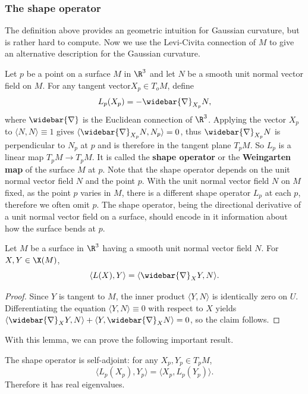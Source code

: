 \subsubsection{The shape operator}
The definition above provides an geometric intuition for Gaussian curvature, but is rather hard to compute. Now we use the Levi-Civita connection of $M$ to give an 
alternative description for the Gaussian curvature.\par
Let $p$ be a point on a surface $M$ in $\R^3$ and let $N$ be a smooth unit normal vector field on $M$. For any tangent vector$X_p\in T_oM$, define
\[L_p(X_p)=-\widebar{\nabla}_{X_p}N,\]
where $\widebar{\nabla}$ is the Euclidean connection of $\R^3$. Applying the vector $X_p$ to $\langle N,N\rangle\equiv 1$ gives $\langle\widebar{\nabla}_{X_p}N,N_p\rangle=0$, 
thus $\widebar{\nabla}_{X_p}N$ is perpendicular to $N_p$ at $p$ and is therefore in the tangent plane $T_pM$. So $L_p$ is a linear map $T_pM\to T_pM$. It is called the 
\textbf{shape operator} or the \textbf{Weingarten map} of the surface $M$ at $p$. Note that the shape operator depends on the unit normal vector field $N$ and the point 
$p$. With the unit normal vector field $N$ on $M$ fixed, as the point $p$ varies in $M$, there is a different shape operator $L_p$ at each $p$, therefore we often omit $p$.
The shape operator, being the directional derivative of a unit normal vector field on a surface, should encode in it information about how the surface bends at $p$.
\begin{lemma}\label{Riemann shape operator lem}
Let $M$ be a surface in $\R^3$ having a smooth unit normal vector field $N$. For $X,Y\in\X(M)$,
\[\langle L(X),Y\rangle=\langle\widebar{\nabla}_XY,N\rangle.\]
\end{lemma}
\begin{proof}
Since $Y$ is tangent to $M$, the inner product $\langle Y,N\rangle$ is identically zero on $U$. Differentiating the equation $\langle Y,N\rangle\equiv 0$ with respect 
to $X$ yields $\langle\widebar{\nabla}_XY,N\rangle+\langle Y,\widebar{\nabla}_XN\rangle=0$, so the claim follows.
\end{proof}
With this lemma, we can prove the following important result.
\begin{proposition}\label{Riemann shape operator self-adjoint}
The shape operator is self-adjoint: for any $X_p,Y_p\in T_pM$,
\[\langle L_p(X_p),Y_p\rangle=\langle X_p,L_p(Y_p)\rangle.\]
Therefore it has real eigenvalues.
\end{proposition}

